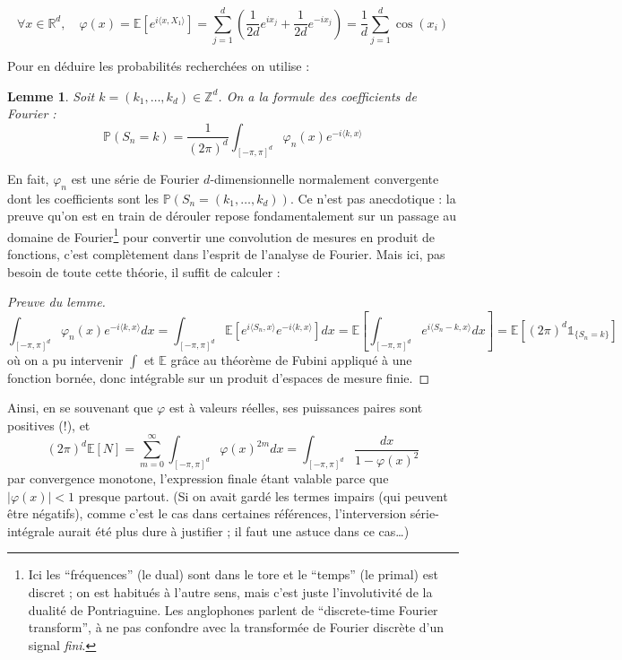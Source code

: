\documentclass[a4paper, 11pt]{article}
\def\Z{\mathbb{Z}}
\def\P{\mathbb{P}}
\def\R{\mathbb{R}}
\def\E{\mathbb{E}}
\def\Indic{\mathbb{1}}
\newtheorem*{lemma}{Lemme}
\begin{document}
\[ \forall x \in \R^d,\quad \varphi(x) = \E\left[ e^{i \langle x, X_1 \rangle}
  \right]
  = \sum_{j=1}^d \left( \frac{1}{2d}e^{ix_j} + \frac{1}{2d}e^{-ix_j}\right)
  = \frac{1}{d} \sum_{j=1}^d \cos(x_i) \]

Pour en déduire les probabilités recherchées on utilise :
\begin{lemma} Soit $k = (k_1, \ldots, k_d) \in \Z^d$. On a la formule des
  coefficients de Fourier :
  \[ \displaystyle \P(S_n = k) = \frac{1}{(2\pi)^d} \int_{[-\pi,\pi]^d}
    \varphi_n(x)e^{-i\langle k,x \rangle} \]
\end{lemma}
En fait, $\varphi_n$ est une série de Fourier $d$-dimensionnelle normalement
convergente dont les coefficients sont les $\P(S_n = (k_1, \ldots, k_d))$. Ce
n'est pas anecdotique : la preuve qu'on est en train de dérouler repose
fondamentalement sur un passage au domaine de Fourier\footnote{Ici les
  \enquote{fréquences} (le dual) sont dans le tore et le \enquote{temps} (le
  primal) est discret ; on est habitués à l'autre sens, mais c'est juste
  l'involutivité de la dualité de Pontriaguine. Les anglophones parlent de
  \enquote{discrete-time Fourier transform}, à ne pas confondre avec la
  transformée de Fourier discrète d'un signal \emph{fini}.} pour convertir une
convolution de mesures en produit de fonctions, c'est complètement dans l'esprit
de l'analyse de Fourier. Mais ici, pas besoin de toute cette théorie, il suffit
de calculer :
\begin{proof}[Preuve du lemme]
  \[ \int_{[-\pi,\pi]^d} \varphi_n(x)e^{-i\langle k,x \rangle} dx =
    \int_{[-\pi,\pi]^d} \E\left[ e^{i\langle S_n, x \rangle} e^{-i\langle k,x
        \rangle}\right] dx
    = \E\left[ \int_{[-\pi,\pi]^d} e^{i\langle S_n - k, x \rangle} dx \right]
    = \E\left[ (2\pi)^d \Indic_{\{S_n = k\}} \right] \]
  où on a pu intervenir $\int$ et $\E$ grâce au théorème de Fubini appliqué à
  une fonction bornée, donc intégrable sur un produit d'espaces de mesure finie.
\end{proof}
Ainsi, en se souvenant que $\varphi$ est à valeurs réelles, ses puissances
paires sont positives (!), et
\[ (2\pi)^d \E[N] = \sum_{m=0}^{\infty} \int_{[-\pi,\pi]^d} \varphi(x)^{2m} dx
  = \int_{[-\pi,\pi]^d} \frac{dx}{1 - \varphi(x)^2}\]
par convergence monotone, l'expression finale étant valable parce que
$|\varphi(x)| < 1$ presque partout. (Si on avait gardé les termes impairs (qui
peuvent être négatifs), comme c'est le cas dans certaines références,
l'interversion série-intégrale aurait été plus dure à justifier ; il faut une
astuce dans ce cas…)
\end{document}
